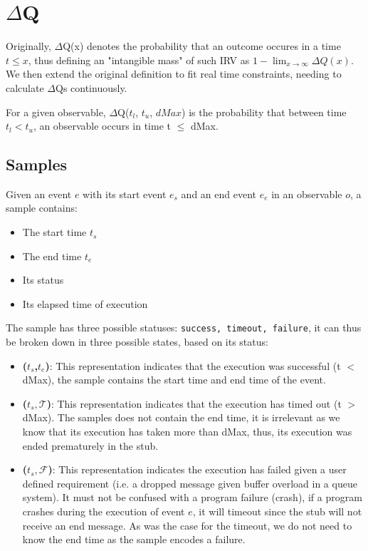 \section{$\Delta$Q}

Originally, $\Delta$Q(x) denotes the probability that an outcome occures in a time $t \le x$, thus defining an "intangible mass" of such IRV as $1 - \lim_{x\to\infty} \Delta Q (x)$.
We then extend the original definition to fit real time constraints, needing to calculate $\Delta$Qs continuously.

For a given observable, $\Delta$Q($t_l$, $t_u$, $dMax$) is the probability that between time $t_l < t_u$, an observable occurs in time t $\le$ dMax.


\subsection{Samples}
    Given an event $e$ with its start event $e_s$ and an end event $e_e$ in an observable $o$, a sample contains:
    \begin{itemize}
        \item The start time $t_s$
        \item The end time $t_e$
        \item Its status 
        \item Its elapsed time of execution
    \end{itemize}
    The sample has three possible statuses: \texttt{success, timeout, failure}, it can thus be broken down in three possible states, based on its status:
    \begin{itemize}
        \item \textbf{($t_s$,$t_e$)}: This representation indicates that the execution was successful (t $<$ dMax), the sample contains the start time and end time of the event.
        \item \textbf{($t_s, \mathcal{T}$)}: This representation indicates that the execution has timed out (t $>$ dMax). The samples does not contain the end time, it is irrelevant as we know that its execution has taken more than dMax, thus, its execution was ended prematurely in the stub.
            \item \textbf{($t_s, \mathcal{F}$)}: This representation indicates the execution has failed given a user defined requirement (i.e. a dropped message given buffer overload in a queue system). It must not be confused with a program failure (crash), if a program crashes during the execution of event $e$, it will timeout since the stub will not receive an end message. As was the case for the timeout, we do not need to know the end time as the sample encodes a failure.
    \end{itemize}


